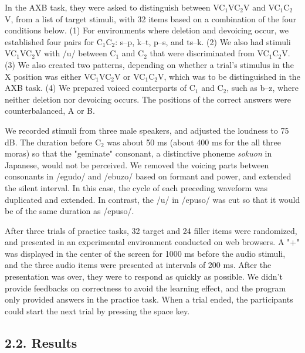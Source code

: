 \documentclass[a4paper,11pt,twocolumn]{article}
\begin{document}
In the AXB task, they were asked to distinguish between VC$_\text{1}$VC$_\text{2}$V and VC$_\text{1}$C$_\text{2}$V, from a list of target stimuli, with 32 items based on a combination of the four conditions below. (1) For environments where deletion and devoicing occur, we established four pairs for C$_\text{1}$C$_\text{2}$: s--p, k--t, p--s, and ts--k. (2) We also had stimuli VC$_\text{1}$VC$_\text{2}$V with /u/ between C$_\text{1}$ and C$_\text{2}$ that were discriminated from VC$_\text{1}$C$_\text{2}$V. (3) We also created two patterns, depending on whether a trial's stimulus in the X position was either VC$_\text{1}$VC$_\text{2}$V or VC$_\text{1}$C$_\text{2}$V, which was to be distinguished in the AXB task. (4) We prepared voiced counterparts of C$_\text{1}$ and C$_\text{2}$, such as b--z, where neither deletion nor devoicing occurs. The positions of the correct answers were counterbalanced, A or B.

We recorded stimuli from three male speakers, and adjusted the loudness to 75 dB. The duration before C$_\text{2}$ was about 50 ms (about 400 ms for the all three moras) so that the "geminate" consonant, a distinctive phoneme \textit{sokuon} in Japanese, would not be perceived. We removed the voicing parts between consonants in /egudo/ and /ebuzo/ based on formant and power, and extended the silent interval. In this case, the cycle of each preceding waveform was duplicated and extended. In contrast, the /u/ in /epuso/ was cut so that it would be of the same duration as /epuso/.

After three trials of practice tasks, 32 target and 24 filler items were randomized, and presented in an experimental environment conducted on web browsers. A "+" was displayed in the center of the screen for 1000 ms before the audio stimuli, and the three audio items were presented at intervals of 200 ms. After the presentation was over, they were to respond as quickly as possible. We didn't provide feedbacks on correctness to avoid the learning effect, and the program only provided answers in the practice task. When a trial ended, the participants could start the next trial by pressing the space key.

\subsection{2.2. Results}
\end{document}
